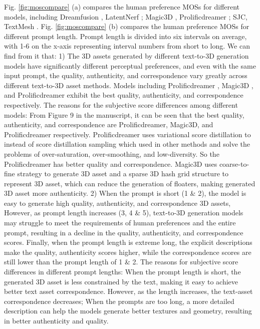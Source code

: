 Fig. \ref{fig:moscompare} (a) compares the human preference MOSs for different models, including Dreamfusion \cite{poole2022dreamfusion}, LatentNerf \cite{metzer2023latent}; Magic3D \cite{lin2023magic3d}, Prolificdreamer \cite{wang2024prolificdreamer}; SJC\cite{wang2023score}, TextMesh \cite{tsalicoglou2023textmesh}. Fig. \ref{fig:moscompare} (b) compares the human preference MOSs for different prompt length. Prompt length is divided into six intervals on average, with 1-6 on the x-axis representing interval numbers from short to long. We can find from it that: 1) The 3D assets generated by different text-to-3D generation models have significantly different perceptual preferences, and even with the same input prompt, the quality, authenticity, and correspondence vary greatly across different text-to-3D asset methods. Models including Prolificdreamer \cite{wang2024prolificdreamer}, Magic3D \cite{lin2023magic3d}, and Prolificdreamer \cite{wang2024prolificdreamer} exhibit the best quality, authenticity, and correspondence respectively. The reasons for the subjective score differences among different models: From Figure 9 in the manuscript, it can be seen that the best quality, authenticity, and correspondence are Prolificdreamer, Magic3D, and Prolificdreamer respectively. Prolificdreamer uses variational score distillation to instead of score distillation sampling which used in other methods and solve the problems of over-saturation, over-smoothing, and low-diversity. So the Prolificdreamer has better quality and correspondence. Magic3D uses coarse-to-fine strategy to generate 3D asset and a sparse 3D hash grid structure to represent 3D asset, which can reduce the generation of floaters, making generated 3D asset more authenticity. 2) When the prompt is short (1 \& 2), the model is easy to generate high quality, authenticity, and correspondence 3D assets, However, as prompt length increases (3, 4 \& 5), text-to-3D generation models may struggle to meet the requirements of human preferences and the entire prompt, resulting in a decline in the quality, authenticity, and correspondence scores. Finally, when the prompt length is extreme long, the explicit descriptions make the quality, authenticity scores higher, while the correspondence scores are still lower than the prompt length of 1 \& 2. The reasons for subjective score differences in different prompt lengths: When the prompt length is short, the generated 3D asset is less constrained by the text, making it easy to achieve better text asset correspondence. However, as the length increases, the text-asset correspondence decreases; When the prompts are too long, a more detailed description can help the models generate better textures and geometry, resulting in better authenticity and quality.




